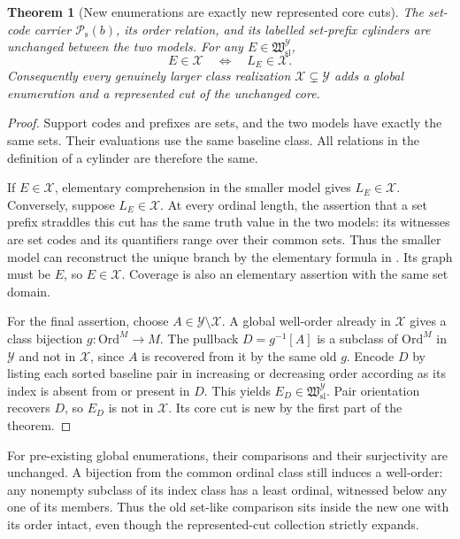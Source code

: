 \documentclass[11pt]{article}
\newtheorem{theorem}{Theorem}[section]
\theoremstyle{definition}
\theoremstyle{remark}
\newcommand{\Ord}{\mathrm{Ord}}
\newcommand{\Hsl}{\mathfrak W_{\mathrm{sl}}}
\newcommand{\Psupp}{\mathcal P_{\mathrm{s}}}
\begin{document}
\begin{theorem}[New enumerations are exactly new represented core cuts]
\label{swo:gs:thm:class-extension}
The set-code carrier $\Psupp(b)$, its order relation, and its labelled
set-prefix cylinders are unchanged between the two models. For any
$E\in \Hsl^{\mathcal Y}$,
\[
 E\in\mathcal X\quad\Longleftrightarrow\quad L_E\in\mathcal X.
\]
Consequently every genuinely larger class realization
$\mathcal X\subsetneq\mathcal Y$ adds a global enumeration and a
represented cut of the unchanged core.
\end{theorem}
\begin{proof}
Support codes and prefixes are sets, and the two models have exactly the
same sets. Their evaluations use the same baseline class. All relations
in the definition of a cylinder are therefore the same.

If $E\in\mathcal X$, elementary comprehension in the smaller model gives
$L_E\in\mathcal X$. Conversely, suppose $L_E\in\mathcal X$. At every
ordinal length, the assertion that a set prefix straddles this cut has
the same truth value in the two models: its witnesses are set codes and
its quantifiers range over their common sets. Thus the smaller model
can reconstruct the unique branch by the elementary formula in
. Its graph must be $E$, so $E\in\mathcal X$.
Coverage is also an elementary assertion with the same set domain.

For the final assertion, choose $A\in\mathcal Y\setminus\mathcal X$.
A global well-order already in $\mathcal X$ gives a class bijection
$g:\Ord^M\to M$. The pullback $D=g^{-1}[A]$ is a subclass of
$\Ord^M$ in $\mathcal Y$ and not in $\mathcal X$, since $A$ is recovered
from it by the same old $g$. Encode $D$ by listing each sorted baseline
pair in increasing or decreasing order according as its index is absent
from or present in $D$. This yields $E_D\in \Hsl^{\mathcal Y}$. Pair
orientation recovers $D$, so $E_D$ is not in $\mathcal X$. Its core cut
is new by the first part of the theorem.
\end{proof}

For pre-existing global enumerations, their comparisons and their
surjectivity are unchanged. A bijection from the common ordinal class
still induces a well-order: any nonempty subclass of its index class has
a least ordinal, witnessed below any one of its members. Thus the old
set-like comparison sits inside the new one with its order intact, even
though the represented-cut collection strictly expands.
\end{document}
